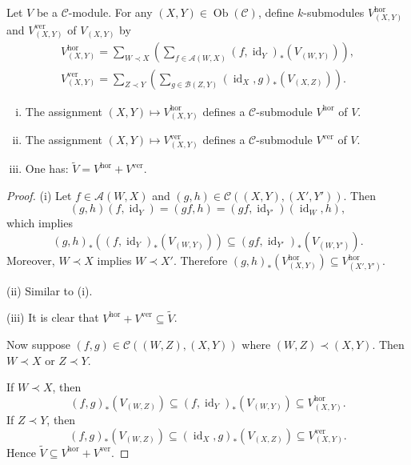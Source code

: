 \documentclass{amsart}
\numberwithin{equation}{section}
\DeclareMathOperator{\Ob}{Ob}
\DeclareMathOperator{\id}{id}
\newcommand{\C}{{\mathscr{C}}}
\newcommand{\A}{{\mathscr{A}}}
\newcommand{\B}{{\mathscr{B}}}
\newcommand{\hor}{{\mathrm{hor}}}
\newcommand{\ver}{{\mathrm{ver}}}
\begin{document}
Let $V$ be a $\C$-module. For any $(X,Y)\in \Ob(\C)$, define $k$-submodules $V^\hor_{(X,Y)}$ and $V^\ver_{(X,Y)}$ of $V_{(X,Y)}$ by
\begin{gather*}
V^\hor_{(X,Y)} =  \sum_{W\prec X} \left( \sum_{f\in \A(W,X)} (f,\id_Y)_*\left(V_{(W,Y)}\right) \right),\\
V^\ver_{(X,Y)} =  \sum_{Z\prec Y} \left( \sum_{g\in \B(Z,Y)} (\id_X,g)_*\left(V_{(X,Z)}\right) \right).
\end{gather*}

\begin{lemma}
\begin{enumerate}[(i)]
\item
The assignment $(X,Y)\mapsto V^\hor_{(X,Y)}$ defines a $\C$-submodule $V^\hor$ of $V$.

\item 
The assignment $(X,Y)\mapsto V^\ver_{(X,Y)}$ defines a $\C$-submodule $V^\ver$ of $V$.

\item
One has: $\widetilde{V} = V^\hor + V^\ver$.
\end{enumerate}
\end{lemma}
\begin{proof}
(i) Let $f\in \A(W, X)$ and $(g,h)\in \C((X,Y), (X',Y'))$. Then
\[ (g,h)(f,\id_Y) = (gf, h) = (gf, \id_{Y'})(\id_W, h), \]
which implies 
\[ (g,h)_* \left( (f,\id_Y)_*\left(V_{(W,Y)}\right) \right) \subseteq (gf, \id_{Y'})_* \left( V_{(W, Y')} \right). \]
Moreover, $W\prec X$ implies $W\prec X'$. Therefore $(g,h)_* \left(V^\hor_{(X,Y)} \right) \subseteq V^\hor_{(X',Y')}$.

(ii) Similar to (i).

(iii) It is clear that $V^\hor + V^\ver \subseteq \widetilde{V}$.

Now suppose $(f, g)\in \C((W,Z), (X,Y))$ where $(W,Z)\prec (X,Y)$. Then $W\prec X$ or $Z\prec Y$. 

If $W\prec X$, then 
\[ (f, g)_* \left( V_{(W,Z)} \right) \subseteq (f, \id_Y)_* \left( V_{(W, Y)} \right) \subseteq V^\hor_{(X,Y)}. \]
If $Z\prec Y$, then
\[ (f, g)_* \left( V_{(W,Z)} \right) \subseteq (\id_X, g)_* \left( V_{(X, Z)} \right) \subseteq V^\ver_{(X,Y)}. \]
Hence $\widetilde{V} \subseteq V^\hor + V^\ver$.
\end{proof}
\end{document}
